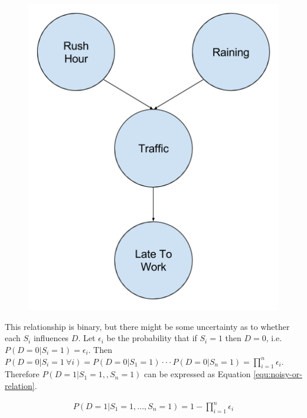 \begin{minipage}[t]{0.35\textwidth}
\vspace{0px}
\begin{figure}[H]
	\centering
	\begin{minipage}[b]{1.0\textwidth}
		\includegraphics[width=\textwidth]{bayesian-network-example.png}
		\caption{}
		\label{fig:bayesian-network-example}
	\end{minipage}
	\hfill
\end{figure}
\end{minipage}

This relationship is binary, but there might be some uncertainty as to whether each $S_i$ influences $D$. Let $\epsilon_i$ be the probability that if $S_i = 1$ then $D = 0$, i.e. $P(D = 0|S_i = 1) = \epsilon_i$. Then $P(D = 0 | S_i = 1\ \forall i) = P(D = 0 | S_1 = 1) \cdot \cdot \cdot P(D = 0 | S_n = 1) = \prod_{i=1}^{n} \epsilon_i$. Therefore $P(D = 1| S_1 = 1, , S_n = 1)$ can be expressed as Equation \ref{equ:noisy-or-relation}.

\begin{align}
P(D = 1 | S_1 = 1, ..., S_n = 1) = 1 - \prod^n_{i=1} \epsilon_i
\label{equ:noisy-or-relation}
\end{align}

